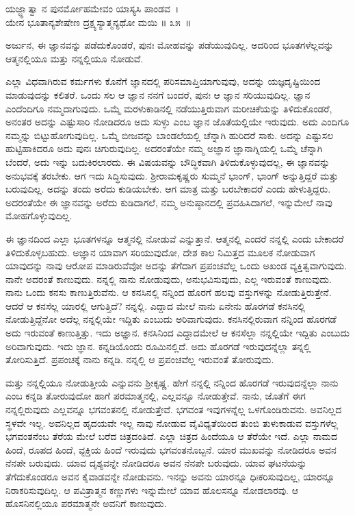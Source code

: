 \begin{shloka}
ಯಜ್ಜ್ಞಾತ್ವಾ ನ ಪುನರ್ಮೋಹಮೇವಂ ಯಾಸ್ಯಸಿ ಪಾಂಡವ~।\\ಯೇನ ಭೂತಾನ್ಯಶೇಷೇಣ ದ್ರಕ್ಷ್ಯಸ್ಯಾತ್ಮನ್ಯಥೋ ಮಯಿ \hfill॥ ೩೫~॥
\end{shloka}

\begin{artha}
ಅರ್ಜುನ, ಈ ಜ್ಞಾನವನ್ನು ಪಡೆದುಕೊಂಡರೆ, ಪುನಃ ಮೋಹವನ್ನು ಪಡೆಯುವುದಿಲ್ಲ. ಅದರಿಂದ ಭೂತಗಳೆಲ್ಲವನ್ನು ಆತ್ಮನಲ್ಲಿಯೂ ಮತ್ತು ನನ್ನಲ್ಲಿಯೂ ನೋಡುವೆ.
\end{artha}

ಎಲ್ಲಾ ವಿಧವಾಗಿರುವ ಕರ್ಮಗಳು ಕೊನೆಗೆ ಜ್ಞಾನದಲ್ಲಿ ಪರಿಸಮಾಪ್ತಿಯಾಗುವುವು, ಅದನ್ನು ಯಜ್ಞದೃಷ್ಟಿಯಿಂದ ಮಾಡುವುದನ್ನು ಕಲಿತರೆ. ಒಂದು ಸಲ ಆ ಜ್ಞಾನ ನನಗೆ ಬಂದರೆ, ಪುನಃ ಆ ಜ್ಞಾನ ಸರಿಯುವುದಿಲ್ಲ. ಜ್ಞಾನ ಎಂದೆಂದಿಗೂ ನಮ್ಮದಾಗುವುದು. ಒಮ್ಮೆ ಮರಳುಕಾಡಿನಲ್ಲಿ ನಡೆಯುತ್ತಿರುವಾಗ ಮರೀಚಿಕೆಯನ್ನು ತಿಳಿದುಕೊಂಡರೆ, ಅನಂತರ ಅದನ್ನು ಎಷ್ಟುಸಾರಿ ನೋಡಿದರೂ ಅದು ಸುಳ್ಳು ಎಂಬ ಜ್ಞಾನ ಜೊತೆಯಲ್ಲಿಯೇ ಇರುವುದು. ಅದು ಎಂದಿಗೂ ನಮ್ಮನ್ನು ಬಿಟ್ಟುಹೋಗುವುದಿಲ್ಲ. ಒಮ್ಮೆ ಬೀಜವನ್ನು ಬಾಂಡಲೆಯಲ್ಲಿ ಚೆನ್ನಾಗಿ ಹುರಿದರೆ ಸಾಕು. ಅದನ್ನು ಎಷ್ಟುಸಲ ಹುಟ್ಟಿಹಾಕಿದರೂ ಅದು ಪುನಃ ಚಿಗುರುವುದಿಲ್ಲ. ಅದರಂತೆಯೇ ನಮ್ಮ ಅಜ್ಞಾನ ಜ್ಞಾನಾಗ್ನಿಯಲ್ಲಿ ಒಮ್ಮೆ ಚೆನ್ನಾಗಿ ಬೆಂದರೆ, ಅದು ಇನ್ನು ಬದುಕಿರಲಾರದು. ಈ ವಿಷಯವನ್ನು ಬೌದ್ಧಿಕವಾಗಿ ತಿಳಿದುಕೊಳ್ಳುವುದಲ್ಲ, ಈ ಜ್ಞಾನವನ್ನು ಅನುಭವಕ್ಕೆ ತರಬೇಕು. ಆಗ ಇದು ಸಿದ್ಧಿಸುವುದು. ಶ‍್ರೀರಾಮಕೃಷ್ಣರು ಸುಮ್ಮನೆ ಭಾಂಗ್, ಭಾಂಗ್ ಅನ್ನುತ್ತಿದ್ದರೆ ಮತ್ತು ಬರುವುದಿಲ್ಲ. ಅದನ್ನು ತಂದು ಅರೆದು ಕುಡಿಯಬೇಕು. ಆಗ ಮಾತ್ರ ಮತ್ತು ಬರಬೇಕಾದರೆ ಎಂದು ಹೇಳುತ್ತಿದ್ದರು. ಅದರಂತೆಯೇ ಈ ಜ್ಞಾನವನ್ನು ಅರೆದು ಕುಡಿದಾಗಲೆ, ನಮ್ಮ ಅನುಷ್ಠಾನದಲ್ಲಿ ಪ್ರವಹಿಸಿದಾಗಲೆ, ಇನ್ನುಮೇಲೆ ನಾವು ಮೋಹಗೊಳ್ಳುವುದಿಲ್ಲ.

ಈ ಜ್ಞಾನದಿಂದ ಎಲ್ಲಾ ಭೂತಗಳನ್ನೂ ಆತ್ಮನಲ್ಲಿ ನೋಡುವೆ ಎನ್ನುತ್ತಾನೆ. ಆತ್ಮನಲ್ಲಿ ಎಂದರೆ ನನ್ನಲ್ಲಿ ಎಂದು ಬೇಕಾದರೆ ತಿಳಿದುಕೊಳ್ಳಬಹುದು. ಅಜ್ಞಾನ ಯಾವಾಗ ಸರಿಯುವುದೋ, ದೇಶ ಕಾಲ ನಿಮಿತ್ತದ ಮೂಲಕ ನೋಡುವಾಗ ಯಾವುದನ್ನು ನಾವು ಆರೋಪ ಮಾಡಿರುವೆವೋ ಅದನ್ನು ತೆಗೆದಾಗ ಪ್ರಪಂಚವೆಲ್ಲ ಒಂದು ಅಖಂಡ ವ್ಯಕ್ತಿತ್ವವಾಗುವುದು. ನಾನೇ ಅದರಂತೆ ಕಾಣುವುದು. ನನ್ನಲ್ಲಿ ನಾನು ನೋಡುವುದು, ಅನುಭವಿಸುವುದು, ಎಲ್ಲ ಇರುವಂತೆ ಕಾಣುವುದು. ನಾನು ಒಂದು ಕನಸು ಕಾಣುತ್ತಿರುವೆನು. ಆ ಕನಸಿನಲ್ಲಿ ನನ್ನಿಂದ ಹೊರಗೆ ಹಲವು ವಸ್ತುಗಳನ್ನು ನೋಡುತ್ತಿರುತ್ತೇನೆ. ಆದರೆ ಆ ಕನಸೆಲ್ಲ ಯಾರಲ್ಲಿ ಆಗುತ್ತಿದೆ? ನನ್ನಲ್ಲಿ. ಎದ್ದಾದ ಮೇಲೆ ನಾನು ಏನೇನು ಹೊರಗಡೆ ಕನಸಿನಲ್ಲಿ ನೋಡುತ್ತಿದ್ದೆನೋ ಅದೆಲ್ಲ ನನ್ನಲ್ಲಿಯೇ ಇದ್ದಿತು ಎಂಬುದು ಅರಿವಾಗುವುದು. ಕನಸಿನಲ್ಲಿರುವಾಗ ನನ್ನಿಂದ ಹೊರಗಡೆ ಅದು ಇರುವಂತೆ ಕಾಣುತ್ತಿತ್ತು. ಇದು ಅಜ್ಞಾನ. ಕನಸಿನಿಂದ ಎದ್ದಾದಮೇಲೆ ಆ ಕನಸೆಲ್ಲಾ ನನ್ನಲ್ಲಿಯೇ ಇದ್ದಿತು ಎಂಬುದು ಅರಿವಾಗುವುದು. ಇದು ಜ್ಞಾನ. ಕನ್ನಡಿಯೊಂದು ರೂಮಿನಲ್ಲಿದೆ. ಅದು ಹೊರಗಡೆ ಇರುವುದನ್ನೆಲ್ಲಾ ತನ್ನಲ್ಲಿ ತೋರಿಸುತ್ತಿದೆ. ಪ್ರಪಂಚಕ್ಕೆ ನಾನು ಕನ್ನಡಿ. ನನ್ನಲ್ಲಿ ಆ ಪ್ರಪಂಚವೆಲ್ಲ ಇರುವಂತೆ ತೋರುವುದು.

ಮತ್ತು ನನ್ನಲ್ಲಿಯೂ ನೋಡುತ್ತೀಯೆ ಎನ್ನುವನು ಶ‍್ರೀಕೃಷ್ಣ. ಹೇಗೆ ನನ್ನಲ್ಲಿ ನನ್ನಿಂದ ಹೊರಗಡೆ ಇರುವುದನ್ನೆಲ್ಲಾ ನಾನು ಎಂಬ ಕನ್ನಡಿ ತೋರುವುದೋ ಹಾಗೆ ಪರಮಾತ್ಮನಲ್ಲಿ, ಎಲ್ಲವನ್ನೂ ನೋಡುತ್ತೇವೆ. ನಾನು, ಜೊತೆಗೆ ಈಗ ನನ್ನಲ್ಲಿರುವುದು ಎಲ್ಲವನ್ನೂ ಭಗವಂತನಲ್ಲಿ ನೋಡುತ್ತೇವೆ. ಭಗವಂತ ಇವುಗಳನ್ನೆಲ್ಲ ಒಳಗೊಂಡಿರುವನು. ಅವನಿಲ್ಲದ ಸ್ಥಳವೇ ಇಲ್ಲ. ಅವನಿಲ್ಲದ ಹೃದಯವೇ ಇಲ್ಲ ನಾವು ನೋಡುವ ವೈವಿಧ್ಯತೆಯಿಂದ ತುಂಬಿ ತುಳುಕಾಡುವ ವಸ್ತುಗಳೆಲ್ಲ ಭಗವಂತನೆಂಬ ತೆರೆಯ ಮೇಲೆ ಬರೆದ ಚಿತ್ರದಂತಿದೆ. ಎಲ್ಲಾ ಚಿತ್ರದ ಹಿಂದೆಯೂ ಆ ತೆರೆಯೇ ಇದೆ. ಎಲ್ಲಾ ನಾಮದ ಹಿಂದೆ, ರೂಪದ ಹಿಂದೆ, ವ್ಟಕ್ತಿಯ ಹಿಂದೆ ಇರುವುದು ಭಗವಂತನೊಬ್ಬನೆ. ಯಾರ ಮುಖವನ್ನು ನೋಡಿದರೂ ಅವನ ನೆನಪೇ ಬರುವುದು. ಯಾವ ದೃಶ್ಯವನ್ನೇ ನೋಡಿದರೂ ಅವನ ನೆನಪೇ ಬರುವುದು. ಯಾವ ಘಟನೆಯನ್ನು ತೆಗೆದುಕೊಂಡರೂ ಅವನ ಕೈವಾಡವನ್ನೇ ನೋಡುವನು. ಇನನ್ನು ಅವನು ಯಾರನ್ನೂ ಧಿಃಕರಿಸುವುದಿಲ್ಲ, ಯಾರನ್ನೂ ನಿರಾಕರಿಸುವುದಿಲ್ಲ. ಆ ಪವಿತ್ರಾತ್ಮನ ಕಣ್ಣುಗಳು ಇನ್ನುಮೇಲೆ ಯಾವ ಹೊಲಸನ್ನೂ ನೋಡಲಾರವು. ಆ ಹೊಸನಿನಲ್ಲಿಯೂ ಪರಮಾತ್ಮನೇ ಅವನಿಗೆ ಕಾಣುವುದು.

